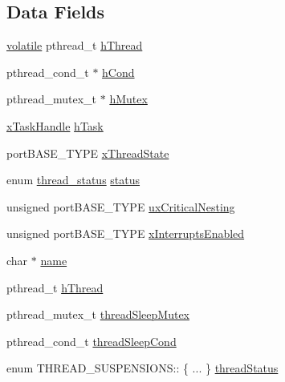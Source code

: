 \subsection*{Data Fields}
\begin{DoxyCompactItemize}
\item 
\hyperlink{group___c_m_s_i_s___core___instruction_interface_gad7d93af13046b0378601b85c8c16673b}{volatile} pthread\-\_\-t \hyperlink{struct_t_h_r_e_a_d___s_u_s_p_e_n_s_i_o_n_s_a5b566189d4a0ca163e0af95155148c09}{h\-Thread}
\item 
pthread\-\_\-cond\-\_\-t $\ast$ \hyperlink{struct_t_h_r_e_a_d___s_u_s_p_e_n_s_i_o_n_s_a88a90f10949e6eae352a27273136493a}{h\-Cond}
\item 
pthread\-\_\-mutex\-\_\-t $\ast$ \hyperlink{struct_t_h_r_e_a_d___s_u_s_p_e_n_s_i_o_n_s_a0eecc48a879aec6cf259b3862db96769}{h\-Mutex}
\item 
\hyperlink{_common_2_libraries_2_free_r_t_o_s_2_source_2include_2task_8h_a271ae40d5db07d928a113766505a0965}{x\-Task\-Handle} \hyperlink{struct_t_h_r_e_a_d___s_u_s_p_e_n_s_i_o_n_s_a6ace02b547a235d84affe319a0b29e74}{h\-Task}
\item 
port\-B\-A\-S\-E\-\_\-\-T\-Y\-P\-E \hyperlink{struct_t_h_r_e_a_d___s_u_s_p_e_n_s_i_o_n_s_a0cf3b432cb0b0a6efd2bf38e656b6978}{x\-Thread\-State}
\item 
enum \hyperlink{osx_2osx_2_libraries_2_free_r_t_o_s_2_source_2portable_2_g_c_c_2_posix_2port_8c_a3ba0ae993b26446020f1d02c37341f8e}{thread\-\_\-status} \hyperlink{struct_t_h_r_e_a_d___s_u_s_p_e_n_s_i_o_n_s_ae22b7147db4527b943e32d42955508eb}{status}
\item 
unsigned port\-B\-A\-S\-E\-\_\-\-T\-Y\-P\-E \hyperlink{struct_t_h_r_e_a_d___s_u_s_p_e_n_s_i_o_n_s_a91b1dc4adc7949de7206346151c5b143}{ux\-Critical\-Nesting}
\item 
unsigned port\-B\-A\-S\-E\-\_\-\-T\-Y\-P\-E \hyperlink{struct_t_h_r_e_a_d___s_u_s_p_e_n_s_i_o_n_s_ae68087f1166c4e014d948833799bbf15}{x\-Interrupts\-Enabled}
\item 
char $\ast$ \hyperlink{struct_t_h_r_e_a_d___s_u_s_p_e_n_s_i_o_n_s_a67e569bcad7a896eaa92a72fd0659c8e}{name}
\item 
pthread\-\_\-t \hyperlink{struct_t_h_r_e_a_d___s_u_s_p_e_n_s_i_o_n_s_a0587fb38462eacbd840ab28a08cb084d}{h\-Thread}
\item 
pthread\-\_\-mutex\-\_\-t \hyperlink{struct_t_h_r_e_a_d___s_u_s_p_e_n_s_i_o_n_s_abe6bcc2de2f8dba1fe9728aee5c466bc}{thread\-Sleep\-Mutex}
\item 
pthread\-\_\-cond\-\_\-t \hyperlink{struct_t_h_r_e_a_d___s_u_s_p_e_n_s_i_o_n_s_a51528b4c2bd1711f3e2395b363af9a0f}{thread\-Sleep\-Cond}
\item 
enum T\-H\-R\-E\-A\-D\-\_\-\-S\-U\-S\-P\-E\-N\-S\-I\-O\-N\-S\-:: \{ ... \}  \hyperlink{struct_t_h_r_e_a_d___s_u_s_p_e_n_s_i_o_n_s_a6134ab35b733888e63e59842c267e7b2}{thread\-Status}
\end{DoxyCompactItemize}


